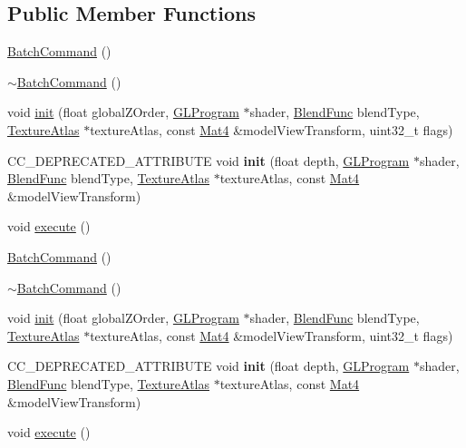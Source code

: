 \subsection*{Public Member Functions}
\begin{DoxyCompactItemize}
\item 
\hyperlink{classBatchCommand_ad6eefd9a6d6ddbd2f5591de8a1c9ff6f}{Batch\+Command} ()
\item 
\hyperlink{classBatchCommand_aaf05282fde697675c8bc18171c87f1f1}{$\sim$\+Batch\+Command} ()
\item 
void \hyperlink{classBatchCommand_a8e0fe35ceddb9f2a7001f659b9ce47c9}{init} (float global\+Z\+Order, \hyperlink{classGLProgram}{G\+L\+Program} $\ast$shader, \hyperlink{structBlendFunc}{Blend\+Func} blend\+Type, \hyperlink{classTextureAtlas}{Texture\+Atlas} $\ast$texture\+Atlas, const \hyperlink{classMat4}{Mat4} \&model\+View\+Transform, uint32\+\_\+t flags)
\item 
\mbox{\label{classBatchCommand_a3bcac74f8c9fa53d33e0614043f27d14}} 
C\+C\+\_\+\+D\+E\+P\+R\+E\+C\+A\+T\+E\+D\+\_\+\+A\+T\+T\+R\+I\+B\+U\+TE void {\bfseries init} (float depth, \hyperlink{classGLProgram}{G\+L\+Program} $\ast$shader, \hyperlink{structBlendFunc}{Blend\+Func} blend\+Type, \hyperlink{classTextureAtlas}{Texture\+Atlas} $\ast$texture\+Atlas, const \hyperlink{classMat4}{Mat4} \&model\+View\+Transform)
\item 
void \hyperlink{classBatchCommand_a064c2181c57145a9c22d7293a1f1febf}{execute} ()
\item 
\hyperlink{classBatchCommand_a91707ba642adedddf02fcdc8d8ee8ca4}{Batch\+Command} ()
\item 
\hyperlink{classBatchCommand_aaf05282fde697675c8bc18171c87f1f1}{$\sim$\+Batch\+Command} ()
\item 
void \hyperlink{classBatchCommand_a8e0fe35ceddb9f2a7001f659b9ce47c9}{init} (float global\+Z\+Order, \hyperlink{classGLProgram}{G\+L\+Program} $\ast$shader, \hyperlink{structBlendFunc}{Blend\+Func} blend\+Type, \hyperlink{classTextureAtlas}{Texture\+Atlas} $\ast$texture\+Atlas, const \hyperlink{classMat4}{Mat4} \&model\+View\+Transform, uint32\+\_\+t flags)
\item 
\mbox{\label{classBatchCommand_a7be46884aba5c10bbd5a0fc7f14c5c3a}} 
C\+C\+\_\+\+D\+E\+P\+R\+E\+C\+A\+T\+E\+D\+\_\+\+A\+T\+T\+R\+I\+B\+U\+TE void {\bfseries init} (float depth, \hyperlink{classGLProgram}{G\+L\+Program} $\ast$shader, \hyperlink{structBlendFunc}{Blend\+Func} blend\+Type, \hyperlink{classTextureAtlas}{Texture\+Atlas} $\ast$texture\+Atlas, const \hyperlink{classMat4}{Mat4} \&model\+View\+Transform)
\item 
void \hyperlink{classBatchCommand_a064c2181c57145a9c22d7293a1f1febf}{execute} ()
\end{DoxyCompactItemize}
